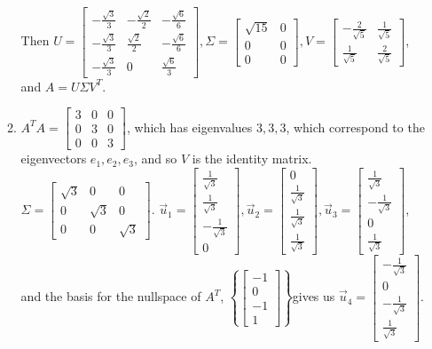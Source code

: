 \documentclass[10pt,english]{article}
\begin{document}
\begin{enumerate}
\begin{enumerate}
        Then $U=\begin{bmatrix}-\frac{\sqrt{3}}{3}&-\frac{\sqrt{2}}{2}&-\frac{\sqrt{6}}{6}\\-\frac{\sqrt{3}}{3}&\frac{\sqrt{2}}{2}&-\frac{\sqrt{6}}{6}\\-\frac{\sqrt{3}}{3}&0&\frac{\sqrt{6}}{3}\end{bmatrix},\Sigma=\begin{bmatrix}\sqrt{15}&0\\0&0\\0&0\end{bmatrix},V=\begin{bmatrix}-\frac{2}{\sqrt{5}}&\frac{1}{\sqrt{5}}\\\frac{1}{\sqrt{5}}&\frac{2}{\sqrt{5}}\end{bmatrix}$, and $A=U\Sigma V^T$. 
        \pagebreak
        \item $A^TA=\begin{bmatrix}3&0&0\\0&3&0\\0&0&3\end{bmatrix}$, which has eigenvalues $3,3,3$, which correspond to the eigenvectors $e_1,e_2,e_3$, and so $V$ is the identity matrix. $\Sigma=\begin{bmatrix}\sqrt{3}&0&0\\0&\sqrt{3}&0\\0&0&\sqrt{3}\end{bmatrix}$. $\vec{u}_1=\begin{bmatrix}\frac{1}{\sqrt{3}}\\\frac{1}{\sqrt{3}}\\-\frac{1}{\sqrt{3}}\\0\end{bmatrix},\vec{u}_2=\begin{bmatrix}0\\\frac{1}{\sqrt{3}}\\\frac{1}{\sqrt{3}}\\\frac{1}{\sqrt{3}}\end{bmatrix},\vec{u}_3=\begin{bmatrix}\frac{1}{\sqrt{3}}\\-\frac{1}{\sqrt{3}}\\0\\\frac{1}{\sqrt{3}}\end{bmatrix}$, and the basis for the nullspace of $A^T$, $\left\{\begin{bmatrix}-1\\0\\-1\\1\end{bmatrix}\right\}$gives us $\vec{u}_4=\begin{bmatrix}-\frac{1}{\sqrt{3}}\\0\\-\frac{1}{\sqrt{3}}\\\frac{1}{\sqrt{3}}\end{bmatrix}$.\\

\end{enumerate}
\end{enumerate}
\end{document}
